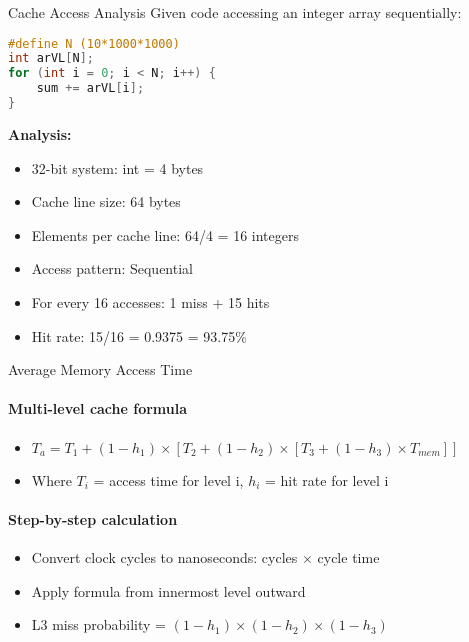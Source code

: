 \begin{example2}{Cache Access Analysis}
    Given code accessing an integer array sequentially:
    
\begin{lstlisting}[language=C, style=basesmol]
#define N (10*1000*1000)
int arVL[N];
for (int i = 0; i < N; i++) {
    sum += arVL[i];
}
\end{lstlisting}

    \tcblower
    
    \textbf{Analysis:}
    \begin{itemize}
        \item 32-bit system: int = 4 bytes
        \item Cache line size: 64 bytes
        \item Elements per cache line: 64/4 = 16 integers
        \item Access pattern: Sequential
        \item For every 16 accesses: 1 miss + 15 hits
        \item Hit rate: 15/16 = 0.9375 = 93.75\%
    \end{itemize}
\end{example2}

\begin{KR}{Average Memory Access Time}
    \paragraph{Multi-level cache formula}
    \begin{itemize}
        \item $T_a = T_1 + (1-h_1) \times [T_2 + (1-h_2) \times [T_3 + (1-h_3) \times T_{mem}]]$
        \item Where $T_i$ = access time for level i, $h_i$ = hit rate for level i
    \end{itemize}
    
    \paragraph{Step-by-step calculation}
    \begin{itemize}
        \item Convert clock cycles to nanoseconds: cycles $\times$ cycle time
        \item Apply formula from innermost level outward
        \item L3 miss probability = $(1-h_1) \times (1-h_2) \times (1-h_3)$
    \end{itemize}
\end{KR}

